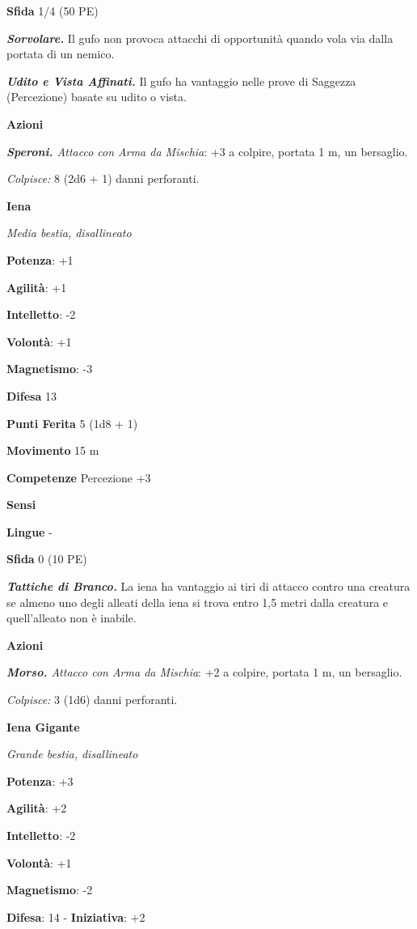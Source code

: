 \begin{multicols}{2}
\textbf{Sfida} 1/4 (50 PE)\smallskip

\emph{\textbf{Sorvolare.}} Il gufo non provoca attacchi di opportunità
quando vola via dalla portata di un nemico.

\emph{\textbf{Udito e Vista Affinati.}} Il gufo ha vantaggio nelle prove
di Saggezza (Percezione) basate su udito o vista.

\smallskip\textbf{Azioni}

\emph{\textbf{Speroni.} Attacco con Arma da Mischia}: +3 a colpire,
portata 1 m, un bersaglio.

\emph{Colpisce:} 8 (2d6 + 1) danni perforanti.

\textbf{Iena}

\emph{Media bestia, disallineato}

\textbf{Potenza}: +1

\textbf{Agilità}: +1

\textbf{Intelletto}: -2

\textbf{Volontà}: +1

\textbf{Magnetismo}: -3

\textbf{Difesa} 13

\textbf{Punti Ferita} 5 (1d8 + 1)

\textbf{Movimento} 15 m

\textbf{Competenze} Percezione +3

\textbf{Sensi} 

\textbf{Lingue} -

\textbf{Sfida} 0 (10 PE)\smallskip

\emph{\textbf{Tattiche di Branco.}} La iena ha vantaggio ai tiri di
attacco contro una creatura se almeno uno degli alleati della iena si
trova entro 1,5 metri dalla creatura e quell'alleato non è inabile.

\smallskip\textbf{Azioni}

\emph{\textbf{Morso.} Attacco con Arma da Mischia}: +2 a colpire,
portata 1 m, un bersaglio.

\emph{Colpisce:} 3 (1d6) danni perforanti.

\textbf{Iena Gigante}

\emph{Grande bestia, disallineato}

\textbf{Potenza}: +3

\textbf{Agilità}: +2

\textbf{Intelletto}: -2

\textbf{Volontà}: +1

\textbf{Magnetismo}: -2

\textbf{Difesa}: 14 - \textbf{Iniziativa}: +2


\end{multicols}
